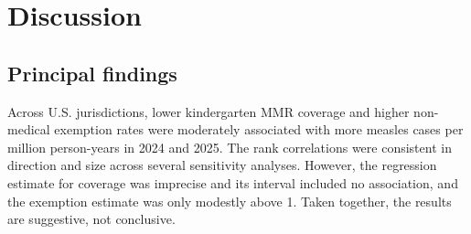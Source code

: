 \documentclass[12pt]{article}
\begin{document}
\begin{table}[H]
\centering\footnotesize
\caption{Associations between kindergarten MMR coverage or non-medical exemption rate and measles cases per million person-years. Spearman $\rho$ with $p$-value; rate ratio (RR) per 1 percentage-point increase with 95\% confidence interval from negative binomial (NB, primary) and Poisson with robust standard errors models. Source: author analysis of CDC and U.S. Census Bureau data.}
\end{table}

\section*{Discussion}
\subsection*{Principal findings}

Across U.S. jurisdictions, lower kindergarten MMR coverage and higher non-medical exemption rates were moderately associated with more measles cases per million person-years in 2024 and 2025. The rank correlations were consistent in direction and size across several sensitivity analyses. However, the regression estimate for coverage was imprecise and its interval included no association, and the exemption estimate was only modestly above 1. Taken together, the results are suggestive, not conclusive.
\end{document}
